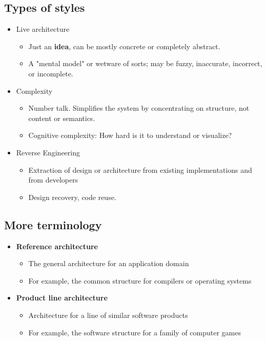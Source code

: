 \documentclass[12pt]{book}
\begin{document}
\subsection*{Types of styles}
\begin{itemize}
  \item Live architecture
  \begin{itemize}
    \item Just an \textbf{idea}, can be mostly concrete or completely abstract.
    \item A "mental model" or wetware of sorts; may be fuzzy, inaccurate, incorrect, or incomplete.
  \end{itemize} 
  \item Complexity
  \begin{itemize}
    \item Number talk. Simplifies the system by concentrating on structure, not content or semantics.
    \item Cognitive complexity: How hard is it to understand or visualize?
  \end{itemize} 
  \item Reverse Engineering
  \begin{itemize}
    \item Extraction of design or architecture from existing implementations and from developers
    \item Design recovery, code reuse.
  \end{itemize} 
\end{itemize}


\subsection*{More terminology}
\begin{itemize}
  \item \textbf{Reference architecture}
  \begin{itemize}
    \item The general architecture for an application domain
    \item For example, the common structure for compilers or operating systems
  \end{itemize} 

  \item \textbf{Product line architecture}
  \begin{itemize}
    \item Architecture for a line of similar software products
    \item For example, the software structure for a family of computer games
  \end{itemize} 
\end{itemize}
\end{document}
